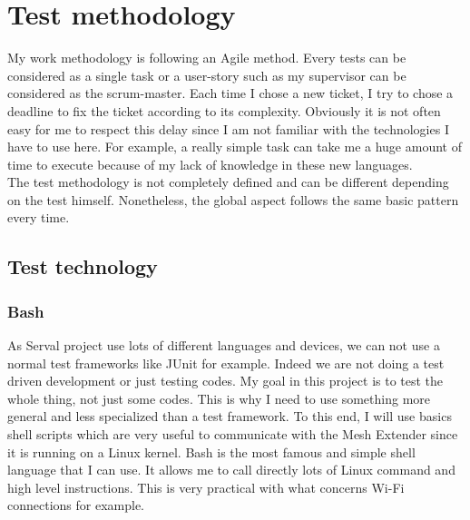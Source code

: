 \section{Test methodology} 
My work methodology is following an Agile method. Every tests can be considered as a single task or a user-story such as my supervisor can be considered as the scrum-master. Each time I chose a new ticket, I try to chose a deadline to fix the ticket according to its complexity. Obviously it is not often easy for me to respect this delay since I am not familiar with the technologies I have to use here. For example, a really simple task can take me a huge amount of time to execute because of my lack of knowledge in these new languages. \\   
The test methodology is not completely defined and can be different depending on the test himself. Nonetheless, the global aspect follows the same basic pattern every time.

\subsection{Test technology}
\subsubsection{Bash}
As Serval project use lots of different languages and devices, we can not use a normal test frameworks like JUnit for example. Indeed we are not doing a test driven development or just testing codes. My goal in this project is to test the whole thing, not just some codes. This is why I need to use something more general and less specialized than a test framework. To this end, I will use basics shell scripts which are very useful to communicate with the Mesh Extender since it is running on a Linux kernel. Bash is the most famous and simple shell language that I can use. It allows me to call directly lots of Linux command and high level instructions. This is very practical with what concerns Wi-Fi connections for example. 

